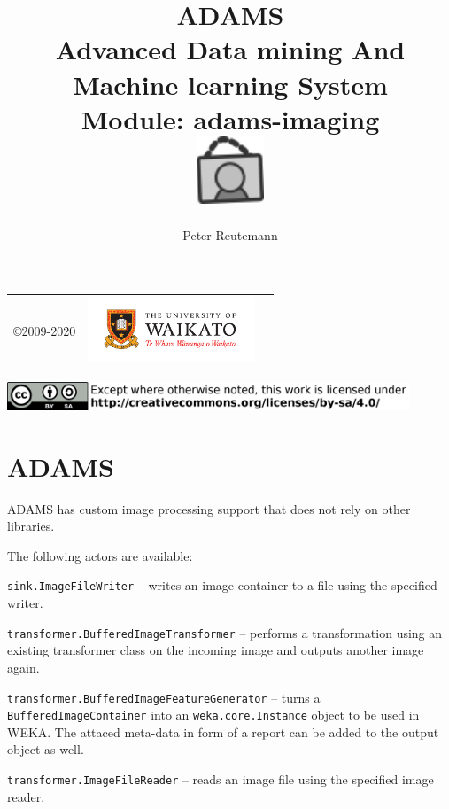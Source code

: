 \documentclass[a4paper]{book}
\title{
  \textbf{ADAMS} \\
  {\Large \textbf{A}dvanced \textbf{D}ata mining \textbf{A}nd \textbf{M}achine
  learning \textbf{S}ystem} \\
  {\Large Module: adams-imaging} \\
  \vspace{1cm}
  \includegraphics[width=2cm]{images/imaging-module.png} \\
}
\author{
  Peter Reutemann
}
\begin{document}
\begin{titlepage}
\maketitle

\thispagestyle{empty}
\center
\begin{table}[b]
	\begin{tabular}{c l l}
		\parbox[c][2cm]{2cm}{\copyright 2009-2020} &
		\parbox[c][2cm]{5cm}{\includegraphics[width=5cm]{images/coat_of_arms.pdf}} \\
	\end{tabular}
	\includegraphics[width=12cm]{images/cc.png} \\
\end{table}

\end{titlepage}

\tableofcontents
\listoffigures


\chapter{ADAMS}
ADAMS has custom image processing support that does not rely on other libraries.

The following actors are available:
\begin{tight_itemize}
	\item \texttt{sink.ImageFileWriter} -- writes an image container to a file
	using the specified writer.
	\item \texttt{transformer.BufferedImageTransformer} -- performs a transformation
	using an existing transformer class on the incoming image and
	outputs another image again.
	\item \texttt{transformer.BufferedImageFeatureGenerator} -- turns a
	\texttt{BufferedImageContainer} into an \texttt{weka.core.Instance} object to
	be used in WEKA. The attaced meta-data in form of a report can be added to the
	output object as well.
	\item \texttt{transformer.ImageFileReader} -- reads an image file using the
	specified image reader.
\end{tight_itemize}
\end{document}
